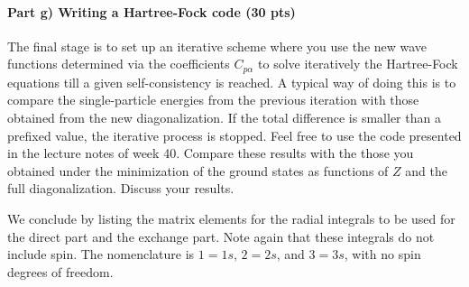 \documentclass[a4wide,10pt]{article}
\begin{document}
\paragraph{Part g) Writing a Hartree-Fock code (30 pts)}
The final stage is to set up an iterative scheme where you use the new
wave functions determined via the coefficients $C_{p\alpha}$ to solve
iteratively the Hartree-Fock equations till a given self-consistency
is reached. A typical way of doing this is to compare the
single-particle energies from the previous iteration with those
obtained from the new diagonalization. If the total difference is
smaller than a prefixed value, the iterative process is stopped.
Feel free to use the code presented in the lecture notes of week 40.
Compare these results with the those you obtained under the
minimization of the ground states as functions of $Z$ and the full
diagonalization. Discuss your results. \newline\newline\newline

We conclude by listing the matrix elements for the radial integrals to
be used for the direct part and the exchange part. Note again that
these integrals do not include spin. The nomenclature is $1=1s$,
$2=2s$, and $3=3s$, with no spin degrees of freedom.
\end{document}
